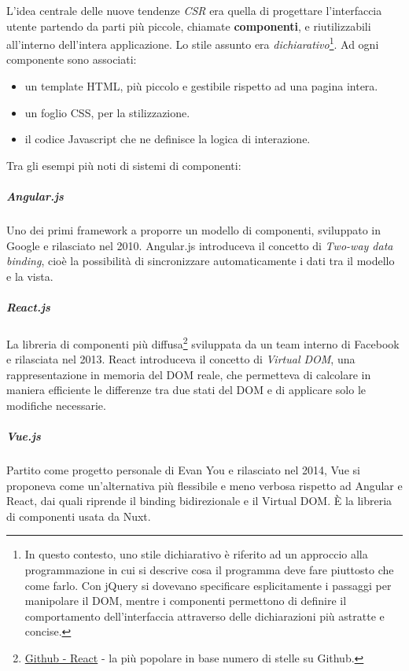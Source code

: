 L'idea centrale delle nuove tendenze \emph{CSR} era quella di progettare
l'interfaccia utente partendo da parti più piccole, chiamate
\textbf{componenti}, e riutilizzabili all'interno dell'intera
applicazione. Lo stile assunto era \emph{dichiarativo}\footnote{In
  questo contesto, uno stile dichiarativo è riferito ad un approccio
  alla programmazione in cui si descrive cosa il programma deve fare
  piuttosto che come farlo. Con jQuery si dovevano specificare
  esplicitamente i passaggi per manipolare il DOM, mentre i componenti
  permettono di definire il comportamento dell'interfaccia attraverso
  delle dichiarazioni più astratte e concise.}. Ad ogni componente sono
associati:

\begin{itemize}
\tightlist
\item
  un template HTML, più piccolo e gestibile rispetto ad una pagina
  intera.
\item
  un foglio CSS, per la stilizzazione.
\item
  il codice Javascript che ne definisce la logica di interazione.
\end{itemize}

Tra gli esempi più noti di sistemi di componenti:

\subparagraph{Angular.js}\label{angular.js}

Uno dei primi framework a proporre un modello di componenti, sviluppato
in Google e rilasciato nel 2010. Angular.js introduceva il concetto di
\emph{Two-way data binding}, cioè la possibilità di sincronizzare
automaticamente i dati tra il modello e la vista.

\subparagraph{React.js}\label{react.js}

La libreria di componenti più diffusa\footnote{\href{https://github.com/facebook/react}{Github
  - React} - la più popolare in base numero di stelle su Github.}
sviluppata da un team interno di Facebook e rilasciata nel 2013. React
introduceva il concetto di \emph{Virtual DOM}, una rappresentazione in
memoria del DOM reale, che permetteva di calcolare in maniera efficiente
le differenze tra due stati del DOM e di applicare solo le modifiche
necessarie.

\subparagraph{Vue.js}\label{vue.js}

Partito come progetto personale di Evan You e rilasciato nel 2014, Vue
si proponeva come un'alternativa più flessibile e meno verbosa rispetto
ad Angular e React, dai quali riprende il binding bidirezionale e il
Virtual DOM. È la libreria di componenti usata da Nuxt.

